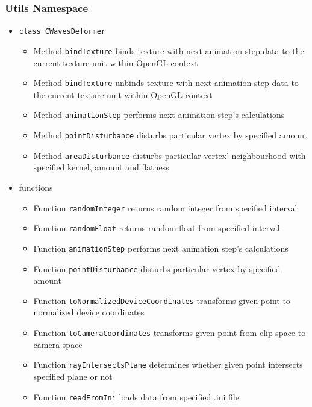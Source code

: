 \documentclass{report}
\begin{document}
\subsubsection{Utils Namespace}
\begin{itemize}
%
%	
\item \texttt{class CWavesDeformer}
		\begin{itemize}
			\item Method \texttt{bindTexture} binds texture with next animation step data to the current texture unit within OpenGL context
			\item Method \texttt{bindTexture} unbinds texture with next animation step data to the current texture unit within OpenGL context
			\item Method \texttt{animationStep} performs next animation step's calculations
			\item Method \texttt{pointDisturbance} disturbs particular vertex by specified amount
			\item Method \texttt{areaDisturbance} disturbs particular vertex' neighbourhood with specified kernel, amount and flatness
		\end{itemize}

\item functions
		\begin{itemize}
			\item Function \texttt{randomInteger} returns random integer from specified interval
			\item Function \texttt{randomFloat} returns random float from specified interval
			\item Function \texttt{animationStep} performs next animation step's calculations
			\item Function \texttt{pointDisturbance} disturbs particular vertex by specified amount
			\item Function \texttt{toNormalizedDeviceCoordinates} transforms given point to normalized device coordinates
			\item Function \texttt{toCameraCoordinates} transforms given point from clip space to camera space
			\item Function \texttt{rayIntersectsPlane} determines whether given point intersects specified plane or not
			\item Function \texttt{readFromIni} loads data from specified .ini file
		\end{itemize}
		
\end{itemize}
\end{document}
